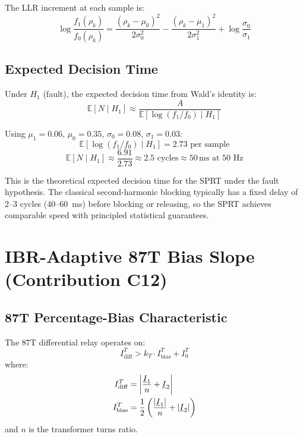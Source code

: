 The LLR increment at each sample is:
\begin{equation}
  \log\frac{f_1(\rho_k)}{f_0(\rho_k)} =
    \frac{(\rho_k - \mu_0)^2}{2\sigma_0^2}
    - \frac{(\rho_k - \mu_1)^2}{2\sigma_1^2}
    + \log\frac{\sigma_0}{\sigma_1}
  \label{eq:ch6_llr_increment}
\end{equation}

\subsection{Expected Decision Time}

Under $H_1$ (fault), the expected decision time from Wald's identity is:
\begin{equation}
  \mathbb{E}[N \mid H_1] \approx \frac{A}{\mathbb{E}[\log(f_1/f_0) \mid H_1]}
  \label{eq:ch6_wald_time}
\end{equation}

Using $\mu_1 = 0.06$, $\mu_0 = 0.35$, $\sigma_0 = 0.08$, $\sigma_1 = 0.03$:
\begin{equation}
  \mathbb{E}[\log(f_1/f_0) \mid H_1] = 2.73 \text{ per sample}
\end{equation}
\begin{equation}
  \mathbb{E}[N \mid H_1] \approx \frac{6.91}{2.73} \approx 2.5 \text{ cycles}
  \approx 50\,\text{ms at 50~Hz}
\end{equation}

This is the theoretical expected decision time for the SPRT under the fault
hypothesis. The classical second-harmonic blocking typically has a fixed
delay of 2--3 cycles (40--60~ms) before blocking or releasing, so the SPRT
achieves comparable speed with principled statistical guarantees.

\section{IBR-Adaptive 87T Bias Slope (Contribution C12)}
\label{sec:ch6_adaptive_bias}

\subsection{87T Percentage-Bias Characteristic}

The 87T differential relay operates on:
\begin{equation}
  I_\mathrm{diff}^T > k_T \cdot I_\mathrm{bias}^T + I_0^T
  \label{eq:ch6_87t_criterion}
\end{equation}
where:
\begin{align}
  I_\mathrm{diff}^T &= \left|\frac{\underline{I}_1}{n} + \underline{I}_2\right|
  \label{eq:ch6_87t_diff} \\
  I_\mathrm{bias}^T &= \frac{1}{2}\left(\frac{|\underline{I}_1|}{n} + |\underline{I}_2|\right)
  \label{eq:ch6_87t_bias}
\end{align}
and $n$ is the transformer turns ratio.

